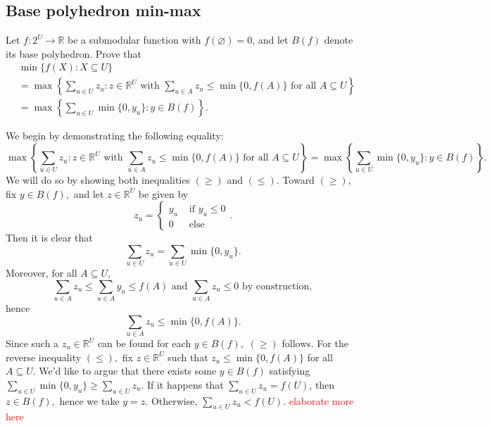 \documentclass{article}
\let\emptyset\varnothing
\newcommand{\R}{\mathbb{R}}
\begin{document}
  \subsection{Base polyhedron min-max}
  \begin{centerframebox}
    Let $f: 2^U \to \R$ be a submodular function with $f(\emptyset) = 0$, and let $B(f)$ denote its base polyhedron. Prove that
    \begin{align*}
      &\min\{f(X):X\subseteq U\} \\
      &= \max\left\{\sum_{u\in U}z_{u}:z\in\R^U \textrm{ with } \sum_{u\in A}z_{u} \leq \min\{0,f(A)\} \textrm{ for all } A\subseteq U\right\} \\
      &=\max\left\{\sum_{u\in U} \min\{0, y_u\}: y\in B(f) \right\}.
    \end{align*}
  \end{centerframebox}
  We begin by demonstrating the following equality:
  \begin{equation}\max\left\{\sum_{u\in U}z_{u}:z\in\R^U \textrm{ with } \sum_{u\in A}z_{u} \leq \min\{0,f(A)\} \textrm{ for all } A\subseteq U\right\}=\max\left\{\sum_{u\in U} \min\{0, y_u\}: y\in B(f) \right\}.\end{equation}We will do so by showing both inequalities $(\geq)$ and $(\leq).$ Toward $(\geq),$ fix $y\in B(f),$ and let $z\in \mathbb{R}^U$ be given by
  $$z_u=\begin{cases}
      y_u & \text{ if }y_u\leq 0\\
      0 & \text{ else }
  \end{cases}.$$
  Then it is clear that $$\sum_{u\in U}z_u=\sum_{u\in U}\min\{0,y_u\}.$$Moreover, for all $A\subseteq U,$ $$\sum_{u\in A}z_u\leq \sum_{u\in A}y_u\leq f(A)\text{ and }\sum_{u\in A}z_u\leq 0\text{ by construction},$$hence $$\sum_{u\in A}z_u\leq \min\{0,f(A)\}.$$Since such a $z_u\in \mathbb{R}^U$ can be found for each $y\in B(f),$ $(\geq)$ follows. For the reverse inequality $(\leq),$ fix $z\in \R^U$ such that $z_u\leq \min\{0,f(A)\}$ for all $A\subseteq U.$ We'd like to argue that there exists some $y\in B(f)$ satisfying $\sum_{u\in U}\min\{0,y_u\}\geq \sum_{u\in U}z_u.$ If it happens that $\sum_{u\in U}z_u=f(U)$, then $z\in B(f),$ hence we take $y=z.$ Otherwise, $\sum_{u\in U}z_u<f(U).$ \textcolor{red}{elaborate more here}


\end{document}
